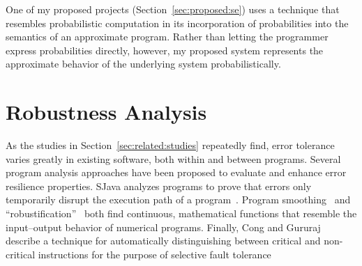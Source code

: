 One of my proposed projects (Section~\ref{sec:proposed:se}) uses a technique
that resembles probabilistic computation in its incorporation of probabilities
into the semantics of an approximate program. Rather than letting the
programmer express probabilities directly, however, my proposed system
represents the approximate behavior of the underlying system
probabilistically.


\section{Robustness Analysis}

As the studies in Section~\ref{sec:related:studies} repeatedly find, error
tolerance varies greatly in existing software, both within and between
programs. Several program analysis approaches have been proposed to evaluate
and enhance error resilience properties. SJava analyzes programs to prove that
errors only temporarily disrupt the execution path of a program~\cite{sjava}.
Program smoothing~\cite{smoothing-cav, smoothing-pldi, smoothing-fse} and
``robustification''~\cite{robustification} both find continuous, mathematical
functions that resemble the input--output behavior of numerical programs.
Finally, Cong and Gururaj describe a technique for automatically
distinguishing between critical and non-critical instructions for the purpose
of selective fault tolerance~\cite{cong-iccad}
